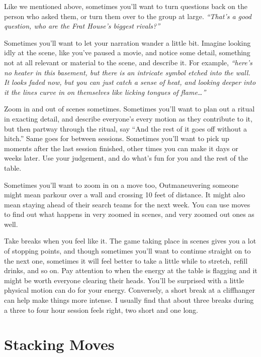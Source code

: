 \documentclass[
  oneside,
  statementpaper,
  9pt]{memoir}
\begin{document}
Like we mentioned above, sometimes you'll want to turn questions back on
the person who asked them, or turn them over to the group at large.
\emph{``That's a good question, who are the Frat House's biggest
rivals?''}

Sometimes you'll want to let your narration wander a little bit. Imagine
looking idly at the scene, like you've paused a movie, and notice some
detail, something not at all relevant or material to the scene, and
describe it. For example, \emph{``here's no heater in this basement, but
there is an intricate symbol etched into the wall. It looks faded now,
but you can just catch a sense of heat, and looking deeper into it the
lines curve in on themselves like licking tongues of flame\ldots{}''}

Zoom in and out of scenes sometimes. Sometimes you'll want to plan out a
ritual in exacting detail, and describe everyone's every motion as they
contribute to it, but then partway through the ritual, say ``And the
rest of it goes off without a hitch.'' Same goes for between sessions.
Sometimes you'll want to pick up moments after the last session
finished, other times you can make it days or weeks later. Use your
judgement, and do what's fun for you and the rest of the table.

Sometimes you'll want to zoom in on a move too, Outmaneuvering someone
might mean parkour over a wall and crossing 10 feet of distance. It
might also mean staying ahead of their search teams for the next week.
You can use moves to find out what happens in very zoomed in scenes, and
very zoomed out ones as well.

Take breaks when you feel like it. The game taking place in scenes gives
you a lot of stopping points, and though sometimes you'll want to
continue straight on to the next one, sometimes it will feel better to
take a little while to stretch, refill drinks, and so on. Pay attention
to when the energy at the table is flagging and it might be worth
everyone clearing their heads. You'll be surprised with a little
physical motion can do for your energy. Conversely, a short break at a
cliffhanger can help make things more intense. I usually find that about
three breaks during a three to four hour session feels right, two short
and one long.

\newpage

\hypertarget{stacking-moves}{%
\chapter{Stacking Moves}\label{stacking-moves}}
\end{document}

